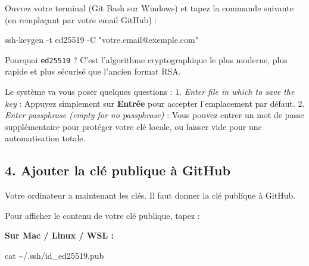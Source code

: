 \documentclass[
  letterpaper,
  DIV=11,
  numbers=noendperiod]{scrreprt}
\newenvironment{Shaded}{\begin{snugshade}}{\end{snugshade}}
\newcommand{\AttributeTok}[1]{\textcolor[rgb]{0.40,0.45,0.13}{#1}}
\newcommand{\FunctionTok}[1]{\textcolor[rgb]{0.28,0.35,0.67}{#1}}
\newcommand{\NormalTok}[1]{\textcolor[rgb]{0.00,0.23,0.31}{#1}}
\newcommand{\StringTok}[1]{\textcolor[rgb]{0.13,0.47,0.30}{#1}}
\begin{document}
Ouvrez votre terminal (Git Bash sur Windows) et tapez la commande
suivante (en remplaçant par votre email GitHub) :

\begin{Shaded}
\begin{Highlighting}[]
\FunctionTok{ssh{-}keygen} \AttributeTok{{-}t}\NormalTok{ ed25519 }\AttributeTok{{-}C} \StringTok{"votre.email@exemple.com"}
\end{Highlighting}
\end{Shaded}

\begin{tcolorbox}[enhanced jigsaw, arc=.35mm, bottomrule=.15mm, bottomtitle=1mm, breakable, colback=white, colbacktitle=quarto-callout-note-color!10!white, colframe=quarto-callout-note-color-frame, coltitle=black, left=2mm, leftrule=.75mm, opacityback=0, opacitybacktitle=0.6, rightrule=.15mm, title=\textcolor{quarto-callout-note-color}{\faInfo}\hspace{0.5em}{Note}, titlerule=0mm, toprule=.15mm, toptitle=1mm]

Pourquoi \texttt{ed25519} ? C'est l'algorithme cryptographique le plus
moderne, plus rapide et plus sécurisé que l'ancien format RSA.

\end{tcolorbox}

Le système va vous poser quelques questions : 1. \emph{Enter file in
which to save the key} : Appuyez simplement sur \textbf{Entrée} pour
accepter l'emplacement par défaut. 2. \emph{Enter passphrase (empty for
no passphrase)} : Vous pouvez entrer un mot de passe supplémentaire pour
protéger votre clé locale, ou laisser vide pour une automatisation
totale.

\subsection{4. Ajouter la clé publique à
GitHub}\label{ajouter-la-cluxe9-publique-uxe0-github}

Votre ordinateur a maintenant les clés. Il faut donner la clé publique à
GitHub.

Pour afficher le contenu de votre clé publique, tapez :

\textbf{Sur Mac / Linux / WSL :}

\begin{Shaded}
\begin{Highlighting}[]
\FunctionTok{cat}\NormalTok{ \textasciitilde{}/.ssh/id\_ed25519.pub}
\end{Highlighting}
\end{Shaded}
\end{document}
